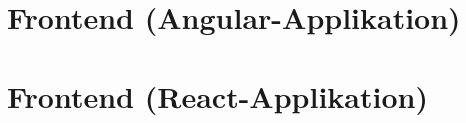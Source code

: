\section{Frontend (Angular-Applikation)}
\lipsum[5-12]

\section{Frontend (React-Applikation)}
\lipsum[5-12]